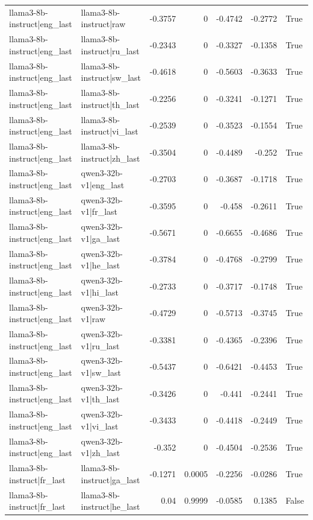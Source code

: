 \begin{table}
\begin{tabular}{l l r r r r l}
llama3-8b-instruct|eng_last & llama3-8b-instruct|raw & -0.3757 & 0 & -0.4742 & -0.2772 & True \\
llama3-8b-instruct|eng_last & llama3-8b-instruct|ru_last & -0.2343 & 0 & -0.3327 & -0.1358 & True \\
llama3-8b-instruct|eng_last & llama3-8b-instruct|sw_last & -0.4618 & 0 & -0.5603 & -0.3633 & True \\
llama3-8b-instruct|eng_last & llama3-8b-instruct|th_last & -0.2256 & 0 & -0.3241 & -0.1271 & True \\
llama3-8b-instruct|eng_last & llama3-8b-instruct|vi_last & -0.2539 & 0 & -0.3523 & -0.1554 & True \\
llama3-8b-instruct|eng_last & llama3-8b-instruct|zh_last & -0.3504 & 0 & -0.4489 & -0.252 & True \\
llama3-8b-instruct|eng_last & qwen3-32b-v1|eng_last & -0.2703 & 0 & -0.3687 & -0.1718 & True \\
llama3-8b-instruct|eng_last & qwen3-32b-v1|fr_last & -0.3595 & 0 & -0.458 & -0.2611 & True \\
llama3-8b-instruct|eng_last & qwen3-32b-v1|ga_last & -0.5671 & 0 & -0.6655 & -0.4686 & True \\
llama3-8b-instruct|eng_last & qwen3-32b-v1|he_last & -0.3784 & 0 & -0.4768 & -0.2799 & True \\
llama3-8b-instruct|eng_last & qwen3-32b-v1|hi_last & -0.2733 & 0 & -0.3717 & -0.1748 & True \\
llama3-8b-instruct|eng_last & qwen3-32b-v1|raw & -0.4729 & 0 & -0.5713 & -0.3745 & True \\
llama3-8b-instruct|eng_last & qwen3-32b-v1|ru_last & -0.3381 & 0 & -0.4365 & -0.2396 & True \\
llama3-8b-instruct|eng_last & qwen3-32b-v1|sw_last & -0.5437 & 0 & -0.6421 & -0.4453 & True \\
llama3-8b-instruct|eng_last & qwen3-32b-v1|th_last & -0.3426 & 0 & -0.441 & -0.2441 & True \\
llama3-8b-instruct|eng_last & qwen3-32b-v1|vi_last & -0.3433 & 0 & -0.4418 & -0.2449 & True \\
llama3-8b-instruct|eng_last & qwen3-32b-v1|zh_last & -0.352 & 0 & -0.4504 & -0.2536 & True \\
llama3-8b-instruct|fr_last & llama3-8b-instruct|ga_last & -0.1271 & 0.0005 & -0.2256 & -0.0286 & True \\
llama3-8b-instruct|fr_last & llama3-8b-instruct|he_last & 0.04 & 0.9999 & -0.0585 & 0.1385 & False \\

\end{tabular}
\end{table}
